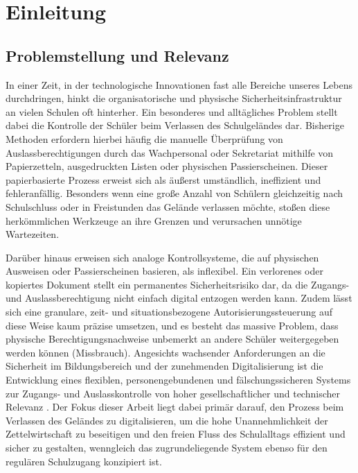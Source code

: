 \section{Einleitung} \label{sec:einleitung}
\subsection{Problemstellung und Relevanz}\label{subsec:problemstellung}
In einer Zeit, in der technologische Innovationen fast alle Bereiche unseres Lebens durchdringen, hinkt die organisatorische und physische Sicherheitsinfrastruktur an vielen Schulen oft hinterher. Ein besonderes und alltägliches Problem stellt dabei die Kontrolle der Schüler beim Verlassen des Schulgeländes dar. Bisherige Methoden erfordern hierbei häufig die manuelle Überprüfung von Auslassberechtigungen durch das Wachpersonal oder Sekretariat mithilfe von Papierzetteln, ausgedruckten Listen oder physischen Passierscheinen. Dieser papierbasierte Prozess erweist sich als äußerst umständlich, ineffizient und fehleranfällig. Besonders wenn eine große Anzahl von Schülern gleichzeitig nach Schulschluss oder in Freistunden das Gelände verlassen möchte, stoßen diese herkömmlichen Werkzeuge an ihre Grenzen und verursachen unnötige Wartezeiten.

Darüber hinaus erweisen sich analoge Kontrollsysteme, die auf physischen Ausweisen oder Passierscheinen basieren, als inflexibel. Ein verlorenes oder kopiertes Dokument stellt ein permanentes Sicherheitsrisiko dar, da die Zugangs- und Auslassberechtigung nicht einfach digital entzogen werden kann. Zudem lässt sich eine granulare, zeit- und situationsbezogene Autorisierungssteuerung auf diese Weise kaum präzise umsetzen, und es besteht das massive Problem, dass physische Berechtigungsnachweise unbemerkt an andere Schüler weitergegeben werden können (Missbrauch). Angesichts wachsender Anforderungen an die Sicherheit im Bildungsbereich und der zunehmenden Digitalisierung ist die Entwicklung eines flexiblen, personengebundenen und fälschungssicheren Systems zur Zugangs- und Auslasskontrolle von hoher gesellschaftlicher und technischer Relevanz \autocite{schwartz2016schoolsafety}. Der Fokus dieser Arbeit liegt dabei primär darauf, den Prozess beim Verlassen des Geländes zu digitalisieren, um die hohe Unannehmlichkeit der Zettelwirtschaft zu beseitigen und den freien Fluss des Schulalltags effizient und sicher zu gestalten, wenngleich das zugrundeliegende System ebenso für den regulären Schulzugang konzipiert ist.

